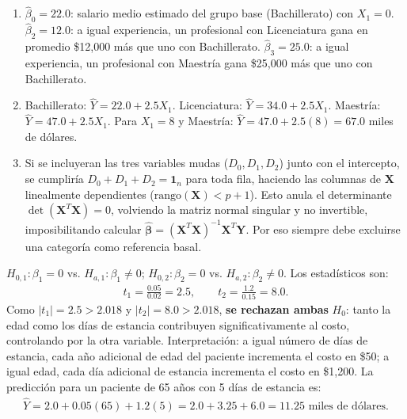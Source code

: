 \begin{solproblema}[prob:ee59291]
	\begin{enumerate}
		\item $\hat{\beta}_0=22.0$: salario medio estimado del grupo base (Bachillerato) con $X_1=0$. $\hat{\beta}_2=12.0$: a igual experiencia, un profesional con Licenciatura gana en promedio \$12,000 más que uno con Bachillerato. $\hat{\beta}_3=25.0$: a igual experiencia, un profesional con Maestría gana \$25,000 más que uno con Bachillerato.
		\item Bachillerato: $\hat{Y}=22.0+2.5X_1$. Licenciatura: $\hat{Y}=34.0+2.5X_1$. Maestría: $\hat{Y}=47.0+2.5X_1$. Para $X_1=8$ y Maestría: $\hat{Y}=47.0+2.5(8)=67.0$ miles de dólares.
		\item Si se incluyeran las tres variables mudas ($D_0,D_1,D_2$) junto con el intercepto, se cumpliría $D_0+D_1+D_2=\mathbf{1}_n$ para toda fila, haciendo las columnas de $\mathbf{X}$ linealmente dependientes ($\text{rango}(\mathbf{X})<p+1$). Esto anula el determinante $\det(\mathbf{X}^T\mathbf{X})=0$, volviendo la matriz normal singular y no invertible, imposibilitando calcular $\hat{\boldsymbol{\beta}}=(\mathbf{X}^T\mathbf{X})^{-1}\mathbf{X}^T\mathbf{Y}$. Por eso siempre debe excluirse una categoría como referencia basal.
	\end{enumerate}
\end{solproblema}

\begin{solproblema}[prob:a6a21c3]
	$H_{0,1}:\beta_1=0$ vs. $H_{a,1}:\beta_1\neq0$; $H_{0,2}:\beta_2=0$ vs. $H_{a,2}:\beta_2\neq0$. Los estadísticos son:
	\begin{align}
		t_1 = \frac{0.05}{0.02} = 2.5, \qquad t_2 = \frac{1.2}{0.15} = 8.0.
	\end{align}
	Como $|t_1|=2.5>2.018$ y $|t_2|=8.0>2.018$, \textbf{se rechazan ambas} $H_0$: tanto la edad como los días de estancia contribuyen significativamente al costo, controlando por la otra variable. Interpretación: a igual número de días de estancia, cada año adicional de edad del paciente incrementa el costo en \$50; a igual edad, cada día adicional de estancia incrementa el costo en \$1,200. La predicción para un paciente de 65 años con 5 días de estancia es:
	\begin{align}
		\hat{Y} = 2.0+0.05(65)+1.2(5) = 2.0+3.25+6.0 = 11.25 \text{ miles de dólares.}
	\end{align}
\end{solproblema}
